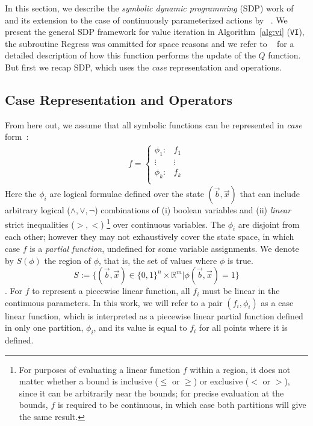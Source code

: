 \label{sec:sdp}

In this section, we describe the \emph{symbolic dynamic programming}
(SDP) work of~\cite{sanner_uai11} and its extension to the case of continuously
parameterized actions by ~\cite{zamani12}.  We present the general SDP
framework for value iteration in Algorithm~\ref{alg:vi} (\texttt{VI}), the subroutine Regress
was ommitted for space reasons and we refer to ~\cite{zamani12} for a detailed description of how this function performs the update of the $Q$ function.
But first we recap SDP,
which uses the \emph{case} representation and operations.

\subsection{Case Representation and Operators}

From here out, we assume that all symbolic functions
can be represented in \emph{case} form~\cite{fomdp}:
{%
\begin{align}
f = 
\begin{cases}
  \phi_1: & f_1 \\ 
 \vdots&\vdots\\ 
  \phi_k: & f_k \\ 
\end{cases} \label{eq:case}
\end{align}
}
Here the $\phi_i$ are logical formulae defined over the state
$(\vec{b},\vec{x})$ that can include arbitrary logical ($\land,\lor,\neg$)
combinations of (i) boolean variables and (ii) 
\emph{linear} strict inequalities ($>,<$) \footnote{ For purposes of evaluating
a linear function $f$ within a region, it does not matter whether a bound is inclusive ($\leq$ or $\geq$) or exclusive ($<$ or $>$), since it can be arbitrarily near the bounds; for precise evaluation at the bounds, $f$ is required to be continuous, in which case both partitions will give the same result.}
over continuous variables.  
The $\phi_i$ are disjoint from each other;  however they may not exhaustively cover the state space, in which case $f$ is a \emph{partial function}, undefined for some
variable assignments. 
We denote by $S(\phi)$ the region of $\phi$, that is, the set of values where $\phi$ is true. $$S := \{ (\vec{b},\vec{x}) \in \{0,1\}^n\times\mathbb{R}^m  | \phi(\vec{b},\vec{x}) = 1 \}$$.
For $f$ to represent a piecewise linear function, all $f_i$ must be linear in the continuous parameters. 
 In this work, we will refer to a pair $( f_i, \phi_i)$ as a case linear function, which is interpreted as a piecewise linear partial function defined in only one partition, $\phi_i$, and its value is equal to $f_i$ for all points where it is defined.

